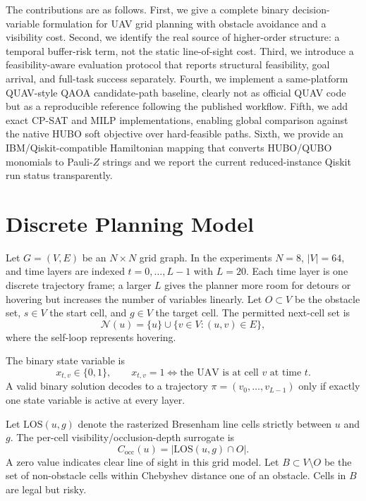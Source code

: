 \documentclass[10pt,conference]{IEEEtran}
\begin{document}
The contributions are as follows. First, we give a complete binary decision-variable formulation for UAV grid planning with obstacle avoidance and a visibility cost. Second, we identify the real source of higher-order structure: a temporal buffer-risk term, not the static line-of-sight cost. Third, we introduce a feasibility-aware evaluation protocol that reports structural feasibility, goal arrival, and full-task success separately. Fourth, we implement a same-platform QUAV-style QAOA candidate-path baseline, clearly not as official QUAV code but as a reproducible reference following the published workflow. Fifth, we add exact CP-SAT and MILP implementations, enabling global comparison against the native HUBO soft objective over hard-feasible paths. Sixth, we provide an IBM/Qiskit-compatible Hamiltonian mapping that converts HUBO/QUBO monomials to Pauli-$Z$ strings and we report the current reduced-instance Qiskit run status transparently.

\section{Discrete Planning Model}
Let $G=(V,E)$ be an $N\times N$ grid graph. In the experiments $N=8$, $|V|=64$, and time layers are indexed $t=0,\ldots,L-1$ with $L=20$. Each time layer is one discrete trajectory frame; a larger $L$ gives the planner more room for detours or hovering but increases the number of variables linearly. Let $O\subset V$ be the obstacle set, $s\in V$ the start cell, and $g\in V$ the target cell. The permitted next-cell set is
\begin{equation}
\mathcal{N}(u)=\{u\}\cup\{v\in V:(u,v)\in E\},
\end{equation}
where the self-loop represents hovering.

The binary state variable is
\begin{equation}
 x_{t,v}\in\{0,1\},\qquad x_{t,v}=1 \Leftrightarrow \text{the UAV is at cell }v\text{ at time }t.
\end{equation}
A valid binary solution decodes to a trajectory $\pi=(v_0,\ldots,v_{L-1})$ only if exactly one state variable is active at every layer.

Let $\mathrm{LOS}(u,g)$ denote the rasterized Bresenham line cells strictly between $u$ and $g$. The per-cell visibility/occlusion-depth surrogate is
\begin{equation}
 C_{\mathrm{occ}}(u)=|\mathrm{LOS}(u,g)\cap O|.
\end{equation}
A zero value indicates clear line of sight in this grid model. Let $B\subset V\setminus O$ be the set of non-obstacle cells within Chebyshev distance one of an obstacle. Cells in $B$ are legal but risky.
\end{document}

